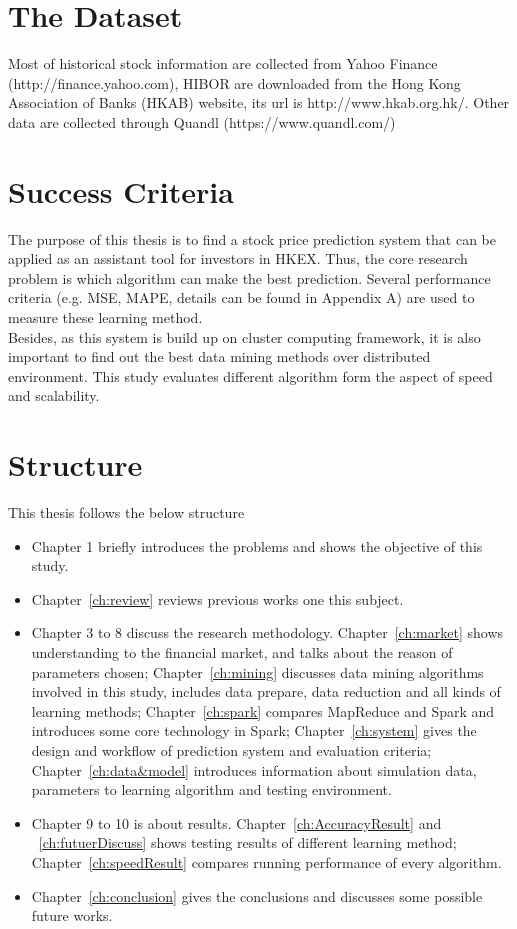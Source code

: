\section{The Dataset}
Most of historical stock information are collected from Yahoo Finance (http://finance.yahoo.com), HIBOR are downloaded from the Hong Kong Association of Banks (HKAB) website, its url is http://www.hkab.org.hk/. Other data are collected through Quandl (https://www.quandl.com/)


\section{Success Criteria}
The purpose of this thesis is to find a stock price prediction system that can be applied as an assistant tool for investors in HKEX. Thus, the core research problem is which algorithm can make the best prediction. Several performance criteria (e.g. MSE, MAPE, details can be found in Appendix A) are used to measure these learning method.\\


Besides, as this system is build up on cluster computing framework, it is also important to find out the best data mining methods over distributed environment. This study evaluates different algorithm form the aspect of speed and scalability.


\section{Structure}
This thesis follows the below structure\par
\begin{itemize}
	\item Chapter 1 briefly introduces the problems and shows the objective of this study.
	\item Chapter~\ref{ch:review} reviews previous works one this subject.
	\item Chapter 3 to 8 discuss the research methodology. Chapter~\ref{ch:market} shows understanding to the financial market, and talks about the reason of parameters chosen; Chapter~\ref{ch:mining} discusses data mining algorithms involved in this study, includes data prepare, data reduction and all kinds of learning methods; Chapter~\ref{ch:spark} compares MapReduce and Spark and introduces some core technology in Spark; Chapter~\ref{ch:system} gives the design and workflow of prediction system and evaluation criteria; Chapter~\ref{ch:data&model} introduces information about simulation data, parameters to learning algorithm and testing environment.
	\item Chapter 9 to 10 is about results.  Chapter~\ref{ch:AccuracyResult} and ~\ref{ch:futuerDiscuss} shows testing results of different learning method; Chapter~\ref{ch:speedResult} compares running performance of every algorithm.
	\item Chapter~\ref{ch:conclusion} gives the conclusions and discusses some possible future works.
\end{itemize}

